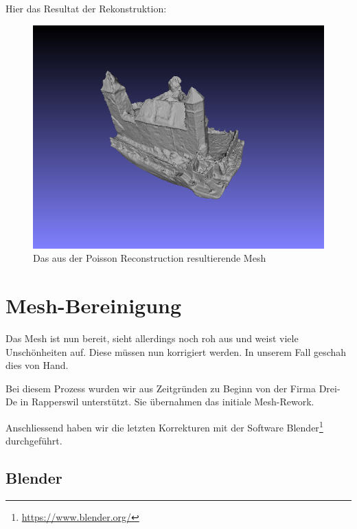 Hier das Resultat der Rekonstruktion:

\begin{figure}[H]
	\centering
	\includegraphics[width=\textwidth]{images/poisson-mesh.png}
	\caption{Das aus der Poisson Reconstruction resultierende Mesh}
	\label{img:meshlab_poisson_result}
\end{figure}


\section{Mesh-Bereinigung}

\label{workflow:mesh-cleanup}

Das Mesh ist nun bereit, sieht allerdings noch roh aus und weist viele
Unschönheiten auf. Diese müssen nun korrigiert werden. In unserem Fall geschah
dies von Hand.

Bei diesem Prozess wurden wir aus Zeitgründen zu Beginn von der Firma Drei-De in
Rapperswil unterstützt. Sie übernahmen das initiale Mesh-Rework.

Anschliessend haben wir die letzten Korrekturen mit der Software
Blender\footnote{\url{https://www.blender.org/}} durchgeführt.

\subsection{Blender}

\label{workflow:blender}

